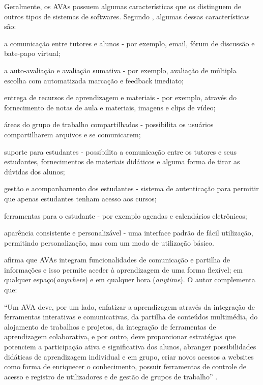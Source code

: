 Geralmente, os AVAs possuem algumas características que os distinguem de outros tipos de sistemas de softwares. Segundo , algumas dessas características são:
\begin{alineascomponto}
    \item a comunicação entre tutores e alunos - por exemplo, email, fórum de discussão e bate-papo virtual;
    \item a auto-avaliação e avaliação sumativa - por exemplo, avaliação de múltipla escolha com automatizada marcação e feedback imediato; 
    \item entrega de recursos de aprendizagem e materiais - por exemplo, através do fornecimento de notas de aula e materiais, imagens e clips de vídeo;
    \item áreas do grupo de trabalho compartilhados - possibilita os usuários compartilharem arquivos e se comunicarem;
    \item suporte para estudantes - possibilita a comunicação entre os tutores e seus estudantes, fornecimentos de materiais didáticos e alguma forma de tirar as dúvidas dos alunos;
    \item gestão e acompanhamento dos estudantes - sistema de autenticação para permitir que apenas estudantes tenham acesso aos cursos;
    \item ferramentas para o estudante - por exemplo agendas e calendários eletrônicos;
    \item aparência consistente e personalizável - uma interface padrão de fácil utilização, permitindo personalização, mas com um modo de utilização básico.
\end{alineascomponto}

 afirma que AVAs integram funcionalidades de comunicação e partilha de informações e isso 
permite aceder à aprendizagem de uma forma flexível; em qualquer espaço(\textit{anywhere}) e em qualquer hora (\textit{anytime}). 
O autor complementa que:

\begin{citacao}
``Um AVA deve, por um lado, enfatizar a aprendizagem através da integração de ferramentas interativas e comunicativas, da 
partilha de conteúdos multimédia, do alojamento de trabalhos e projetos, da integração de ferramentas de aprendizagem colaborativa, 
e por outro, deve proporcionar estratégias que potenciem a participação ativa e significativa dos alunos, abranger possibilidades 
didáticas de aprendizagem individual e em grupo, criar novos acessos a websites como forma de enriquecer o conhecimento, possuir 
ferramentas de controle de acesso e registro de utilizadores e de gestão de grupos de trabalho'' \cite[p.~41]{carvalho2013ambiente}. 
\end{citacao}

